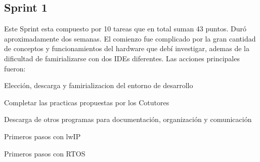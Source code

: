 \subsection{Sprint 1}
Este Sprint esta compuesto por 10 tareas que en total suman 43 puntos. Duró aproximadamente dos semanas. El comienzo fue complicado por la gran cantidad de conceptos y funcionamientos del hardware que debí investigar, ademas de la dificultad de famirializarse con dos IDEs diferentes. Las acciones principales fueron:
\begin{description}
\item Elección, descarga y famirializacion del entorno de desarrollo
\item Completar las practicas propuestas por los Cotutores
\item Descarga de otros programas para documentación, organización y comunicación
\item Primeros pasos con lwIP
\item Primeros pasos con RTOS
\end{description}

